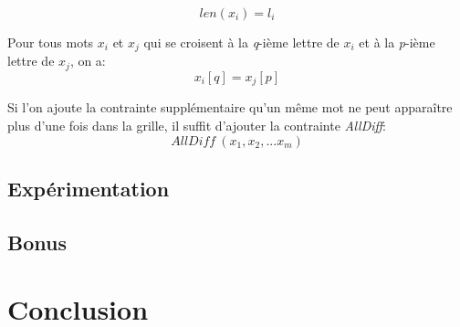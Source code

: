 \documentclass[11pt, letterpaper]{article}
\begin{document}
\begin{equation} 
len(x_{i}) = l_{i}
\end{equation}
\par
Pour tous mots $x_{i}$ et $x_{j}$ qui se croisent \`{a} la \textit{q}-i\`{e}me lettre de $x_{i}$ et \`{a} la \textit{p}-i\`{e}me lettre de $x_{j}$, on a:
\begin{equation} 
x_{i}[q] = x_{j}[p]
\end{equation}
\par
Si l'on ajoute la contrainte suppl\'{e}mentaire qu'un m\^{e}me mot ne peut appara\^{i}tre plus d'une fois dans la grille, il suffit d'ajouter la contrainte \textit{AllDiff}:
\begin{equation} 
\textit{AllDiff}~(x_{1},x_{2},...x_{m})
\end{equation}

\subsection{Exp\'{e}rimentation}

\subsection{Bonus}

\newpage

\section*{Conclusion}
\end{document}
